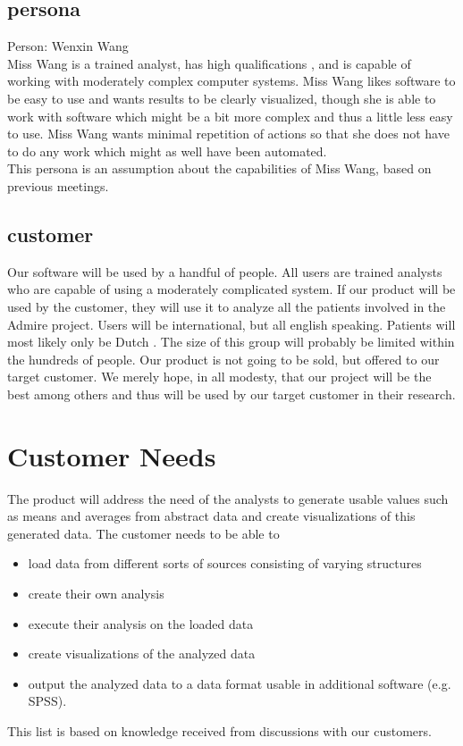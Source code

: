 \documentclass[a4paper]{article}
\begin{document}
\subsection{persona}
Person: Wenxin Wang \\
Miss Wang is a trained analyst, has high qualifications \cite{persona}, and is capable of working with moderately complex computer systems. Miss Wang likes software to be easy to use and wants results to be clearly visualized, though she is able to work with software which might be a bit more complex and thus a little less easy to use. Miss Wang wants minimal repetition of actions so that she does not have to do any work which might as well have been automated. \\
This persona is an assumption about the capabilities of Miss Wang, based on previous meetings.

\subsection{customer}
Our software will be used by a handful of people. All users are trained analysts who are capable of using a moderately complicated system. If our product will be used by the customer, they will use it to analyze all the patients involved in the Admire project. Users will be international, but all english speaking. Patients will most likely only be Dutch \cite{admire2}. The size of this group will probably be limited within the hundreds of people. Our product is not going to be sold, but offered to our target customer. We merely hope, in all modesty, that our project will be the best among others and thus will be used by our target customer in their research. 

\section{Customer Needs}
The product will address the need of the analysts to generate usable values such as means and averages from abstract data and create visualizations of this generated data. The customer needs to be able to 
\begin{itemize}
\item load data from different sorts of sources consisting of varying structures 
\item create their own analysis 
\item execute their analysis on the loaded data
\item create visualizations of the analyzed data
\item output the analyzed data to a data format usable in additional software (e.g. SPSS).
\end{itemize}
This list is based on knowledge received from discussions with our customers. 
\end{document}
